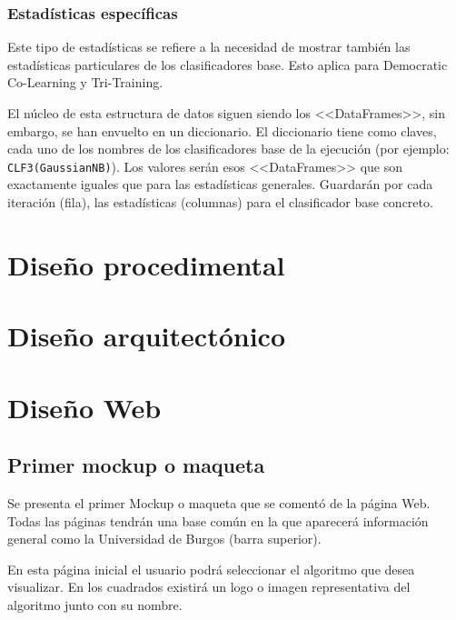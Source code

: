 \subsubsection{Estadísticas específicas}
Este tipo de estadísticas se refiere a la necesidad de mostrar también las
estadísticas particulares de los clasificadores base. Esto aplica para
Democratic Co-Learning y Tri-Training.

El núcleo de esta estructura de datos siguen siendo los <<DataFrames>>, sin
embargo, se han envuelto en un diccionario. El diccionario tiene como claves,
cada uno de los nombres de los clasificadores base de la ejecución (por ejemplo:
\texttt{CLF3(GaussianNB)}). Los valores serán esos <<DataFrames>> que son
exactamente iguales que para las estadísticas generales. Guardarán por cada
iteración (fila), las estadísticas (columnas) para el clasificador base
concreto.

\section{Diseño procedimental}


\section{Diseño arquitectónico}

\section{Diseño Web}

\subsection{Primer mockup o maqueta}
Se presenta el primer Mockup o maqueta que se comentó de la página Web. Todas
las páginas tendrán una base común en la que aparecerá información general como
la Universidad de Burgos (barra superior).


En esta página inicial el usuario podrá seleccionar el algoritmo que desea
visualizar. En los cuadrados existirá un logo o imagen representativa del
algoritmo junto con su nombre.


